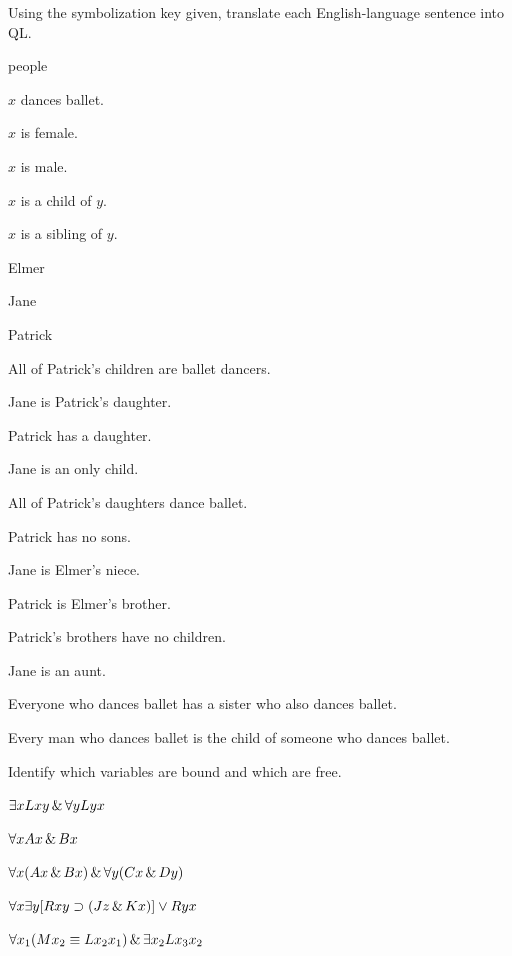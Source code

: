 \solutions
\problempart
\label{pr.QLballet}
Using the symbolization key given, translate each English-language sentence into QL.
\begin{ekey}
\item[UD:] people
\item[Dx:] $x$ dances ballet.
\item[Fx:] $x$ is female.
\item[Mx:] $x$ is male.
\item[Cxy:] $x$ is a child of $y$.
\item[Sxy:] $x$ is a sibling of $y$.
\item[e:] Elmer
\item[j:] Jane
\item[p:] Patrick
\end{ekey}
\begin{earg}
\item All of Patrick's children are ballet dancers.
\item Jane is Patrick's daughter.
\item Patrick has a daughter.
\item Jane is an only child.
\item All of Patrick's daughters dance ballet.
\item Patrick has no sons.
\item Jane is Elmer's niece.
\item Patrick is Elmer's brother.
\item Patrick's brothers have no children.
\item Jane is an aunt.
\item Everyone who dances ballet has a sister who also dances ballet.
\item Every man who dances ballet is the child of someone who dances ballet.
\end{earg}

\problempart
\label{pr.freeQL}
Identify which variables are bound and which are free.
\begin{earg}
\item $\exists x Lxy \,\&\, \forall y Lyx$
\item $\forall x Ax \,\&\, Bx$
\item $\forall x (Ax \,\&\, Bx) \,\&\, \forall y(Cx \,\&\, Dy)$
\item $\forall x\exists y[Rxy \supset (Jz \,\&\, Kx)] \vee Ryx$
\item $\forall x_1(Mx_2 \equiv Lx_2x_1) \,\&\, \exists x_2 Lx_3x_2$
\end{earg}

